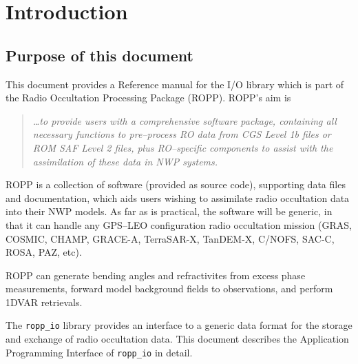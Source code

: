 
\chapter{Introduction}\label{chap:introduction}

\section{Purpose of this document}

This document provides a Reference manual for the I/O library which is
part of the Radio Occultation Processing Package (ROPP). ROPP's aim is
%
\begin{quote}
  \emph{\ldots{}to provide users with a comprehensive software
    package, containing all necessary functions to pre--process RO
    data from CGS Level 1b files or ROM SAF Level 2 files, plus
    RO--specific components to assist with the assimilation of these
    data in NWP systems.}
\end{quote}
%
ROPP is a collection of software (provided as source code), supporting
data files and documentation, which aids users wishing to assimilate
radio occultation data into their NWP models. As far as is practical,
the software will be generic, in that it can handle any GPS--LEO
configuration radio occultation mission (GRAS, COSMIC, CHAMP, GRACE-A, 
TerraSAR-X, TanDEM-X, C/NOFS, SAC-C, ROSA, PAZ, etc). 

ROPP can generate bending angles and refractivites from excess phase 
measurements, forward model background fields to observations, 
and perform 1DVAR retrievals. 

The \texttt{ropp\_io} library provides an interface to a generic data 
format for the storage and exchange of radio occultation data. This 
document describes the Application Programming Interface of \texttt{ropp\_io} 
in detail. 

